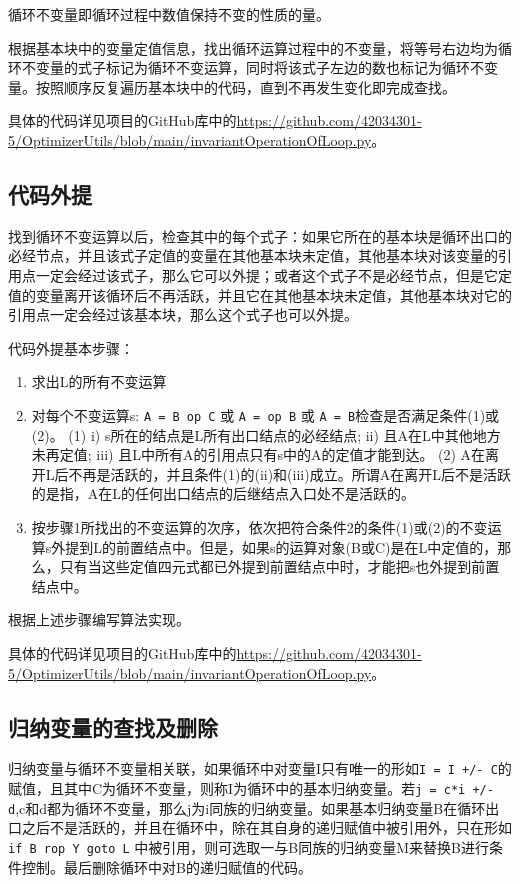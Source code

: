 \documentclass[cn,black,11pt,normal]{elegantnote}
\begin{document}
循环不变量即循环过程中数值保持不变的性质的量。

根据基本块中的变量定值信息，找出循环运算过程中的不变量，将等号右边均为循环不变量的式子标记为循环不变运算，同时将该式子左边的数也标记为循环不变量。按照顺序反复遍历基本块中的代码，直到不再发生变化即完成查找。


具体的代码详见项目的GitHub库中的\url{https://github.com/42034301-5/OptimizerUtils/blob/main/invariantOperationOfLoop.py}。

\subsection{代码外提}

找到循环不变运算以后，检查其中的每个式子：如果它所在的基本块是循环出口的必经节点，并且该式子定值的变量在其他基本块未定值，其他基本块对该变量的引用点一定会经过该式子，那么它可以外提；或者这个式子不是必经节点，但是它定值的变量离开该循环后不再活跃，并且它在其他基本块未定值，其他基本块对它的引用点一定会经过该基本块，那么这个式子也可以外提。

代码外提基本步骤：

\begin{enumerate}
    \item 求出L的所有不变运算
    \item 对每个不变运算s: \lstinline{A = B op C} 或 \lstinline{A = op B}  或 \lstinline{A = B}检查是否满足条件(1)或(2)。
        \subitem (1) i) s所在的结点是L所有出口结点的必经结点; ii) 且A在L中其他地方未再定值; iii) 且L中所有A的引用点只有s中的A的定值才能到达。
        \subitem (2) A在离开L后不再是活跃的，并且条件(1)的(ii)和(iii)成立。所谓A在离开L后不是活跃的是指，A在L的任何出口结点的后继结点入口处不是活跃的。
    \item 按步骤1所找出的不变运算的次序，依次把符合条件2的条件(1)或(2)的不变运算s外提到L的前置结点中。但是，如果s的运算对象(B或C)是在L中定值的，那么，只有当这些定值四元式都已外提到前置结点中时，才能把s也外提到前置结点中。
\end{enumerate}
根据上述步骤编写算法实现。

具体的代码详见项目的GitHub库中的\url{https://github.com/42034301-5/OptimizerUtils/blob/main/invariantOperationOfLoop.py}。

\subsection{归纳变量的查找及删除}

归纳变量与循环不变量相关联，如果循环中对变量I只有唯一的形如\lstinline{I = I +/- C}的赋值，且其中C为循环不变量，则称I为循环中的基本归纳变量。若\lstinline{j = c*i +/- d},c和d都为循环不变量，那么j为i同族的归纳变量。如果基本归纳变量B在循环出口之后不是活跃的，并且在循环中，除在其自身的递归赋值中被引用外，只在形如\lstinline{if B rop Y goto L} 中被引用，则可选取一与B同族的归纳变量M来替换B进行条件控制。最后删除循环中对B的递归赋值的代码。
\end{document}
